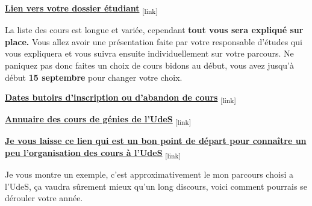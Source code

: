 \bigbreak
\href{https://www.usherbrooke.ca/helios/lib880/dosetu/menu_offert.htm}{\textbf{Lien vers votre dossier étudiant}}\textsubscript{  [link]}
\bigbreak

 La liste des cours est longue et variée, cependant \textbf{tout vous sera expliqué sur place.} Vous allez avoir une présentation faite par votre responsable d’études qui vous expliquera et vous suivra ensuite individuellement sur votre parcours. Ne paniquez pas donc faites un choix de cours bidons au début, vous avez jusqu'à début \textbf{15 septembre} pour changer votre choix.

 \bigbreak
 \href{Annexes/Sherbrooke/Date_Limite.pdf}{\textbf{Dates butoirs d'inscription ou d'abandon de cours}}\textsubscript{  [link]}
 \bigbreak

\bigbreak
\href{Annexes/Sherbrooke/Annuaire_Genie_Electrique.pdf}{\textbf{Annuaire des cours de génies de l'UdeS}}\textsubscript{  [link]}
\bigbreak

\href{https://www.usherbrooke.ca/admission/programme/620/maitrise-en-genie-electrique/}{\textbf{Je vous laisse ce lien qui est un bon point de départ pour connaître un peu l'organisation des cours à l'UdeS}}\textsubscript{  [link]}
\bigbreak

Je vous montre un exemple, c'est approximativement le mon parcours choisi a l'UdeS, ça vaudra sûrement mieux qu'un long discours, voici comment pourrais se dérouler votre année.

